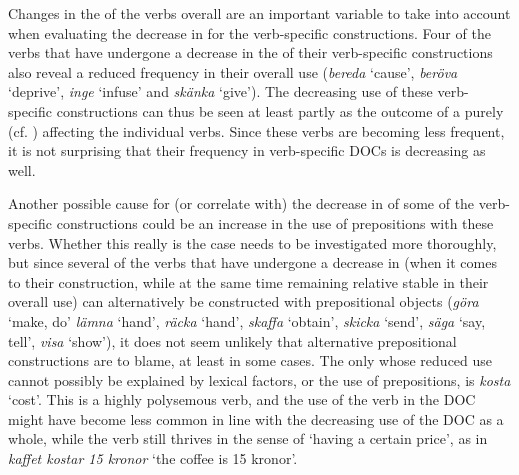 \documentclass[output=paper]{langscibook}
\begin{document}
Changes in the  of the verbs overall are an important variable to take into account when evaluating the decrease in  for the verb-specific constructions. Four of the verbs that have undergone a decrease in the  of their verb-specific constructions also reveal a reduced frequency in their overall use (\textit{bereda} ‘cause’, \textit{beröva} ‘deprive’, \textit{inge} ‘infuse’ and \textit{skänka} ‘give’). The decreasing use of these verb-specific constructions can thus be seen at least partly as the outcome of a purely  (cf. \citealt[192]{CollemanDe_Clerck2011}) affecting the individual verbs. Since these verbs are becoming less frequent, it is not surprising that their frequency in verb-specific DOCs is decreasing as well.


Another possible cause for (or correlate with) the decrease in  of some of the verb-specific constructions could be an increase in the use of prepositions with these verbs. Whether this really is the case needs to be investigated more thoroughly, but since several of the verbs that have undergone a decrease in  (when it comes to their  construction, while at the same time remaining relative stable in their overall use) can alternatively be constructed with prepositional objects (\textit{göra} ‘make, do’ \textit{lämna} ‘hand’, \textit{räcka} ‘hand’, \textit{skaffa} ‘obtain’, \textit{skicka} ‘send’, \textit{säga} ‘say, tell’, \textit{visa} ‘show’), it does not seem unlikely that alternative prepositional constructions are to blame, at least in some cases. The only  whose reduced use cannot possibly be explained by lexical factors, or the use of prepositions, is \textit{kosta} ‘cost’. This is a highly polysemous verb, and the use of the verb in the DOC might have become less common in line with the decreasing use of the DOC as a whole, while the verb still thrives in the sense of ‘having a certain price’, as in \textit{kaffet kostar 15 kronor} ‘the coffee is 15 kronor’.
\end{document}
